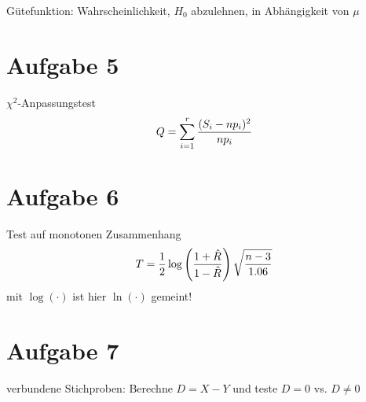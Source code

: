 \documentclass{article}
\begin{document}
	Gütefunktion: Wahrscheinlichkeit, $H_0$ abzulehnen, in Abhängigkeit von $\mu$
	
	\section*{Aufgabe 5}
	$\chi^2$-Anpassungstest
	\begin{align}
		Q = \sum_{i=1}^{r} \frac{(S_i - np_i)^2}{np_i} \notag
	\end{align}

	\section*{Aufgabe 6}
	Test auf monotonen Zusammenhang
	\begin{align}
		T = \frac{1}{2}\log\left(\frac{1+ \hat{R}}{1-\hat{R}}\right)\sqrt{\frac{n-3}{1.06}} \notag
	\end{align}
	mit $\log(\cdot)$ ist hier $\ln(\cdot)$ gemeint!
	
	\section*{Aufgabe 7}
	verbundene Stichproben: Berechne $D = X - Y$ und teste $D=0$ vs. $D\neq 0$
	
\end{document}
